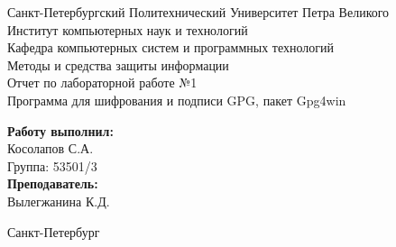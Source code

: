 \documentclass[a4paper]{article}
\begin{document}

\begin{titlepage}	%

	\begin{center}		%

		\large Санкт-Петербургский Политехнический Университет Петра Великого\\
		\large Институт компьютерных наук и технологий \\
		\large Кафедра компьютерных систем и программных технологий\\[6cm]
		
		\huge Методы и средства защиты информации\\[0.5cm] %
		\large Отчет по лабораторной работе №1\\[0.1cm]
		\large Программа для шифрования и подписи GPG, пакет Gpg4win\\[5cm]

	\end{center}


	\begin{flushright} %
		\begin{minipage}{0.25\textwidth} %
			\begin{flushleft} %

				\large\textbf{Работу выполнил:}\\
				\large Косолапов С.А.\\
				\large {Группа:} 53501/3\\
				
				\large \textbf{Преподаватель:}\\
				\large Вылегжанина К.Д.

			\end{flushleft}
		\end{minipage}
	\end{flushright}
	
	\vfill %

	\begin{center}
	\large Санкт-Петербург\\
	\large \the\year %
	\end{center} %

\thispagestyle{empty} %
\end{titlepage} %
\end{document}
